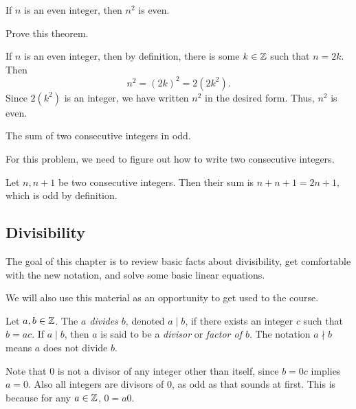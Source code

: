 \documentclass{ximera}
\begin{document}
 

\begin{br}

\begin{thm}
If $n$ is an even integer, then $n^2$ is even.
\end{thm}

 Prove this theorem.

\begin{solution}
 If $n$ is an even integer, then by definition, there is some $k\in\mathbb Z$ such that $n=2k$. Then \[n^2=(2k)^2=2(2k^2).\] Since $2(k^2)$ is an integer, we have written $n^2$ in the desired form. Thus, $n^2$ is even.
\end{solution}
\end{br}
 
 
\begin{cs}
  \begin{thm}
The sum of two consecutive integers in odd.
\end{thm}
For this problem, we need to figure out how to write two consecutive integers. 
\begin{solution}
 Let $n,n+1$ be two consecutive integers. Then their sum is $n+n+1=2n+1,$ which is odd by definition.
\end{solution}
\end{cs}


\subsection{Divisibility}%

The goal of this chapter is to review basic facts about divisibility, get comfortable with the new notation, and solve some basic linear equations.

We will also use this material as an opportunity to get used to the course. 

\begin{defn}
 Let $a,b\in \mathbb Z$. The \emph{$a$ divides $b$}, denoted $a\mid b$,  if there exists an integer $c$ such that $b=ac$. If $a\mid b$, then $a$ is said to be a \emph{divisor} or \emph{factor of $b$}. The notation $a\nmid b$ means $a$ does not divide $b$.
\end{defn}

Note that 0 is not a divisor of any integer other than itself, since $b=0c$ implies $a=0$. Also all integers are divisors of 0, as odd as that sounds at first. This is because for any $a\in\mathbb Z$, $0=a0$. 
\end{document}
